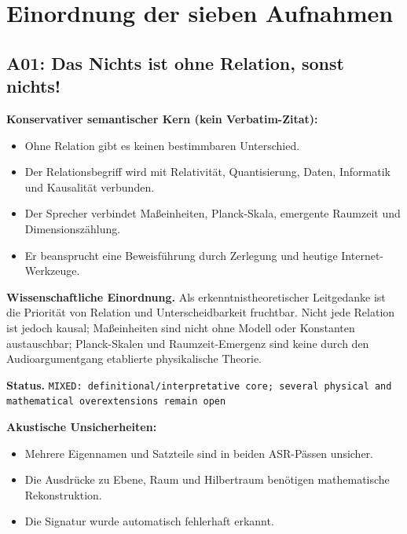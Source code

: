 \documentclass[11pt,a4paper]{article}
\newcommand{\status}[1]{\texttt{#1}}
\begin{document}
\section{Einordnung der sieben Aufnahmen}

\subsection{A01: Das Nichts ist ohne Relation, sonst nichts!}
\label{sec:a01}
\textbf{Konservativer semantischer Kern (kein Verbatim-Zitat):}
\begin{itemize}
\item Ohne Relation gibt es keinen bestimmbaren Unterschied.
\item Der Relationsbegriff wird mit Relativität, Quantisierung, Daten, Informatik und Kausalität verbunden.
\item Der Sprecher verbindet Maßeinheiten, Planck-Skala, emergente Raumzeit und Dimensionszählung.
\item Er beansprucht eine Beweisführung durch Zerlegung und heutige Internet-Werkzeuge.
\end{itemize}

\textbf{Wissenschaftliche Einordnung.} Als erkenntnistheoretischer Leitgedanke ist die Priorität von Relation und Unterscheidbarkeit fruchtbar. Nicht jede Relation ist jedoch kausal; Maßeinheiten sind nicht ohne Modell oder Konstanten austauschbar; Planck-Skalen und Raumzeit-Emergenz sind keine durch den Audioargumentgang etablierte physikalische Theorie.

\textbf{Status.} \status{MIXED: definitional/interpretative core; several physical and mathematical overextensions remain open}

\textbf{Akustische Unsicherheiten:}
\begin{itemize}
\item Mehrere Eigennamen und Satzteile sind in beiden ASR-Pässen unsicher.
\item Die Ausdrücke zu Ebene, Raum und Hilbertraum benötigen mathematische Rekonstruktion.
\item Die Signatur wurde automatisch fehlerhaft erkannt.
\end{itemize}
\end{document}
